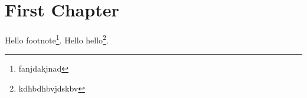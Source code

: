 \chapter{First Chapter}
\lipsum
Hello footnote\footnote{fanjdakjnad}.
Hello hello\footnote{kdhbdhbvjdskbv}.
